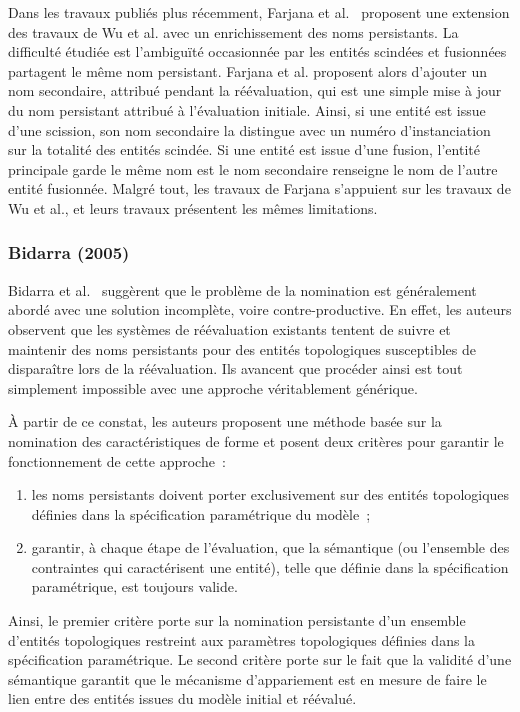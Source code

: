 Dans les travaux publiés plus récemment, Farjana et
al.~\cite{farjana2015method,farjana2016implementation} proposent une extension
des travaux de Wu et al. avec un enrichissement des noms persistants. %
La difficulté étudiée est l'ambiguïté occasionnée par les entités scindées et
fusionnées partagent le même nom persistant. %
Farjana et al. proposent alors d'ajouter un nom secondaire, attribué pendant la
réévaluation, qui est une simple mise à jour du nom persistant attribué à
l'évaluation initiale. %
Ainsi, si une entité est issue d'une scission, son nom secondaire la distingue avec un numéro d'instanciation sur la totalité des entités scindée. %
Si une entité est issue d'une fusion, l'entité principale garde le même nom est
le nom secondaire renseigne le nom de l'autre entité fusionnée. %
Malgré tout, les travaux de Farjana s'appuient sur les travaux de Wu et
al., et leurs travaux présentent les mêmes limitations. %




\subsubsection*{Bidarra (2005) }



Bidarra et al.~\cite{bidarra2005feature} suggèrent que le problème de la
nomination est généralement abordé avec une solution incomplète, voire
contre-productive. %
En effet, les auteurs observent que les systèmes de réévaluation existants
tentent de suivre et maintenir des noms persistants pour des entités
topologiques susceptibles de disparaître lors de la réévaluation. %
Ils avancent que procéder ainsi est tout simplement impossible avec une approche
véritablement générique. %

À partir de ce constat, les auteurs proposent une méthode basée sur la nomination des caractéristiques de forme et posent deux critères pour garantir le fonctionnement de cette approche~: %
\begin{enumerate}
	\item les noms persistants doivent porter exclusivement sur des entités
	      topologiques définies dans la spécification paramétrique du modèle~; %
	\item garantir, à chaque étape de l'évaluation, que la sémantique (ou
	      l'ensemble des contraintes qui caractérisent une entité), telle que
	      définie dans la spécification paramétrique, est toujours valide. %
\end{enumerate}
Ainsi, le premier critère porte sur la nomination persistante d'un ensemble
d'entités topologiques restreint aux paramètres topologiques définies dans la
spécification paramétrique. %
Le second critère porte sur le fait que la validité d'une sémantique garantit
que le mécanisme d'appariement est en mesure de faire le lien entre des entités
issues du modèle initial et réévalué. %

